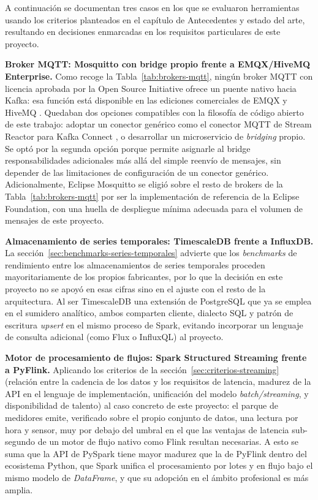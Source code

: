 A continuación se documentan tres casos en los que se evaluaron herramientas usando los criterios planteados en el capítulo de Antecedentes y estado del arte, resultando en decisiones enmarcadas en los requisitos particulares de este proyecto.

\textbf{Broker MQTT: Mosquitto con bridge propio frente a EMQX/HiveMQ Enterprise.} Como recoge la Tabla~\ref{tab:brokers-mqtt}, ningún broker MQTT con licencia aprobada por la Open Source Initiative ofrece un puente nativo hacia Kafka: esa función está disponible en las ediciones comerciales de EMQX \cite{emqx2026} y HiveMQ \cite{hivemq2026}. Quedaban dos opciones compatibles con la filosofía de código abierto de este trabajo: adoptar un conector genérico como el conector MQTT de Stream Reactor para Kafka Connect \cite{lensesio2026}, o desarrollar un microservicio de \textit{bridging} propio. Se optó por la segunda opción porque permite asignarle al bridge responsabilidades adicionales más allá del simple reenvío de mensajes, sin depender de las limitaciones de configuración de un conector genérico. Adicionalmente, Eclipse Mosquitto se eligió sobre el resto de brokers de la Tabla~\ref{tab:brokers-mqtt} por ser la implementación de referencia de la Eclipse Foundation, con una huella de despliegue mínima adecuada para el volumen de mensajes de este proyecto.

\textbf{Almacenamiento de series temporales: TimescaleDB frente a InfluxDB.} La sección~\ref{sec:benchmarks-series-temporales} advierte que los \textit{benchmarks} de rendimiento entre los almacenamientos de series temporales proceden mayoritariamente de los propios fabricantes, por lo que la decisión en este proyecto no se apoyó en esas cifras sino en el ajuste con el resto de la arquitectura. Al ser TimescaleDB una extensión de PostgreSQL que ya se emplea en el sumidero analítico, ambos comparten cliente, dialecto SQL y patrón de escritura \textit{upsert} en el mismo proceso de Spark, evitando incorporar un lenguaje de consulta adicional (como Flux o InfluxQL) al proyecto.

\textbf{Motor de procesamiento de flujos: Spark Structured Streaming frente a PyFlink.} Aplicando los criterios de la sección~\ref{sec:criterios-streaming} (relación entre la cadencia de los datos y los requisitos de latencia, madurez de la API en el lenguaje de implementación, unificación del modelo \textit{batch/streaming}, y disponibilidad de talento) al caso concreto de este proyecto: el parque de medidores emite, verificado sobre el propio conjunto de datos, una lectura por hora y sensor, muy por debajo del umbral en el que las ventajas de latencia sub-segundo de un motor de flujo nativo como Flink resultan necesarias. A esto se suma que la API de PySpark tiene mayor madurez que la de PyFlink dentro del ecosistema Python, que Spark unifica el procesamiento por lotes y en flujo bajo el mismo modelo de \textit{DataFrame}, y que su adopción en el ámbito profesional es más amplia.

